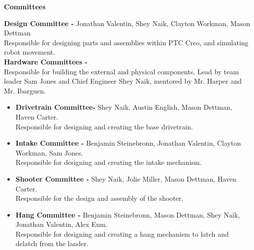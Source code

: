 \documentclass[
letterpaper, %
11pt, %
onecolumn, %
openany, %
]{dndbook}
\begin{document}

% 
% 


 
% 
% 
% 




                                                     
                                                     

\clearpage 
\pagestyle{plain}
\noindent\textbf{\Huge Committees}
\newline

\noindent\textbf{\Large Design Committee -} Jonathan Valentin, Shey Naik, Clayton Workman, Mason Dettman \\ Responsible for designing parts and assemblies within PTC Creo, and simulating robot movement. \\
\newline\noindent\textbf{\Large Hardware Committees -}
\\ Responsible for building the external and physical components. Lead by team leader Sam Jones and Chief Engineer Shey Naik, mentored by Mr. Harper and Mr. Ibarguen.\\

\begin{itemize}

\item \textbf{Drivetrain Committee-} Shey Naik, Austin English, Mason Dettman, Haven Carter. \\ Responsible for designing and creating the base drivetrain.

\item \textbf{Intake Committee -} Benjamin Steinebronn, Jonathan Valentin, Clayton Workman, Sam Jones.  \\ Responsible for designing and creating the intake mechanism. 

\item \textbf{Shooter Committee -} Shey Naik, Jolie Miller, Mason Dettman, Haven Carter. \\Responsible for the design and assembly of the shooter. 

\item \textbf{Hang Committee -} Benjamin Steinebronn, Mason Dettman, Shey Naik, Jonathan Valentin, Alex Eum. \\  Responsible for designing and creating a hang mechanism to latch and delatch from the lander. 

\end{itemize} 
\end{document}

